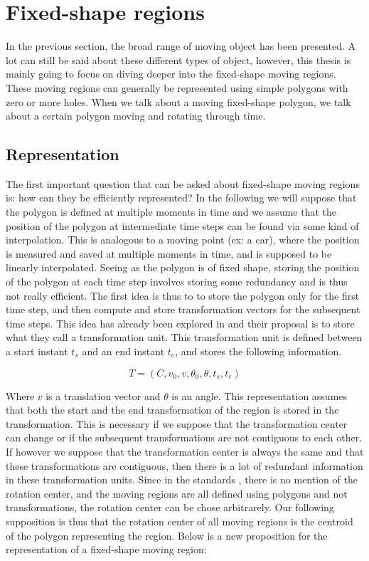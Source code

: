\section{Fixed-shape regions}

	In the previous section, the broad range of moving object has been presented. A lot can still be said about these different types of object, however, this thesis is mainly going to focus on diving deeper into the fixed-shape moving regions. These moving regions can generally be represented using simple polygons with zero or more holes. When we talk about a moving fixed-shape polygon, we talk about a certain polygon moving and rotating through time.
	
	\subsection{Representation}

	The first important question that can be asked about fixed-shape moving regions is: how can they be efficiently represented? In the following we will suppose that the polygon is defined at multiple moments in time and we assume that the position of the polygon at intermediate time steps can be found via some kind of interpolation. This is analogous to a moving point (ex: a car), where the position is measured and saved at multiple moments in time, and is supposed to be linearly interpolated. Seeing as the polygon is of fixed shape, storing the position of the polygon at each time step involves storing some redundancy and is thus not really efficient. The first idea is thus to to store the polygon only for the first time step, and then compute and store transformation vectors for the subsequent time steps. This idea has already been explored in \cite{fmregion} and their proposal is to store what they call a transformation unit. This transformation unit is defined between a start instant \( t_s \) and an end instant \( t_e \), and stores the following information.

	\begin{equation}
		T = (C, v_0, v, \theta_0, \theta, t_{s}, t_{e})
	\end{equation}

Where \( v \) is a translation vector and \( \theta \) is an angle. This representation assumes that both the start and the end transformation of the region is stored in the transformation. This is necessary if we suppose that the transformation center can change or if the subsequent transformations are not contiguous to each other. If however we suppose that the transformation center is always the same and that these transformations are contiguous, then there is a lot of redundant information in these transformation units. Since in the standards , there is no mention of the rotation center, and the moving regions are all defined using polygons and not transformations, the rotation center can be chose arbitrarely. Our following supposition is thus that the rotation center of all moving regions is the centroid of the polygon representing the region. Below is a new proposition for the representation of a fixed-shape moving region:

